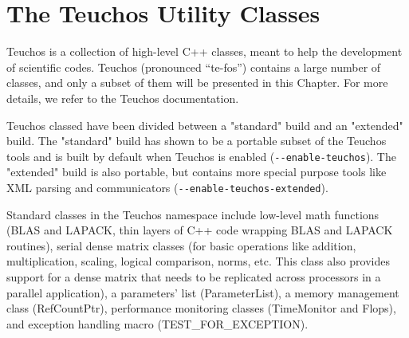% 
% 
% 
%   
%   
% 
% 

\section{The Teuchos Utility Classes}
\label{chap:teuchos}

Teuchos is a collection of high-level C++ classes, meant to 
help the development of scientific codes. Teuchos (pronounced
``te-fos'') contains a large number of classes, and only a subset of
them will be presented in this Chapter. For more details, we refer to
the Teuchos documentation.

Teuchos classed have been divided between a "standard" build and an
"extended" build. The "standard" build has shown to be a portable subset
of the Teuchos tools and is built by default when Teuchos is enabled \newline
(\verb!--enable-teuchos!). The "extended" build is also portable, but
contains more special purpose tools like XML parsing and communicators
(\verb!--enable-teuchos-extended!).

Standard classes in the Teuchos namespace include low-level math
functions (BLAS and LAPACK, thin layers of C++ code wrapping BLAS and
LAPACK routines), serial dense matrix classes (for basic operations like
addition, multiplication, scaling, logical comparison, norms, etc. This
class also provides support for a dense matrix that needs to be
replicated across processors in a parallel application), a parameters'
list (ParameterList), a memory management class (RefCountPtr),
performance monitoring classes (TimeMonitor and Flops),
and exception handling macro (TEST\_FOR\_EXCEPTION).

